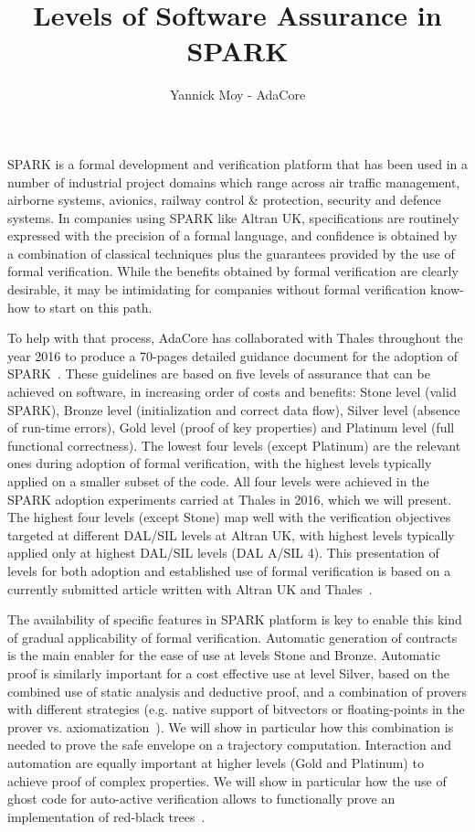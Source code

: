 \documentclass{article}
\title{Levels of Software Assurance in SPARK}
\author{Yannick Moy - AdaCore}
\date{}
\begin{document}
\sloppy
\maketitle

SPARK is a formal development and verification platform that has been used in a number of industrial project domains which range across air traffic management, airborne systems, avionics, railway control \& protection, security and defence systems. In companies using SPARK like Altran UK, specifications are routinely expressed with the precision of a formal language, and confidence is obtained by a combination of classical techniques plus the guarantees provided by the use of formal verification. While the benefits obtained by formal verification are clearly desirable, it may be intimidating for companies without formal verification know-how to start on this path.

To help with that process, AdaCore has collaborated with Thales throughout the year 2016 to produce a 70-pages detailed guidance document for the adoption of SPARK~\cite{guidance}. These guidelines are based on five levels of assurance that can be achieved on software, in increasing order of costs and benefits: Stone level (valid SPARK), Bronze level (initialization and correct data flow), Silver level (absence of run-time errors), Gold level (proof of key properties) and Platinum level (full functional correctness). The lowest four levels (except Platinum) are the relevant ones during adoption of formal verification, with the highest levels typically applied on a smaller subset of the code. All four levels were achieved in the SPARK adoption experiments carried at Thales in 2016, which we will present. The highest four levels (except Stone) map well with the verification objectives targeted at different DAL/SIL levels at Altran UK, with highest levels typically applied only at highest DAL/SIL levels (DAL A/SIL 4). This presentation of levels for both adoption and established use of formal verification is based on a currently submitted article written with Altran UK and Thales~\cite{IEEESoftware}.

The availability of specific features in SPARK platform is key to enable this kind of gradual applicability of formal verification. Automatic generation of contracts is the main enabler for the ease of use at levels Stone and Bronze. Automatic proof is similarly important for a cost effective use at level Silver, based on the combined use of static analysis and deductive proof, and a combination of provers with different strategies (e.g. native support of bitvectors or floating-points in the prover vs. axiomatization~\cite{bitvectors}). We will show in particular how this combination is needed to prove the safe envelope on a trajectory computation. Interaction and automation are equally important at higher levels (Gold and Platinum) to achieve proof of complex properties. We will show in particular how the use of ghost code for auto-active verification allows to functionally prove an implementation of red-black trees~\cite{redblacktrees}.



\end{document}
